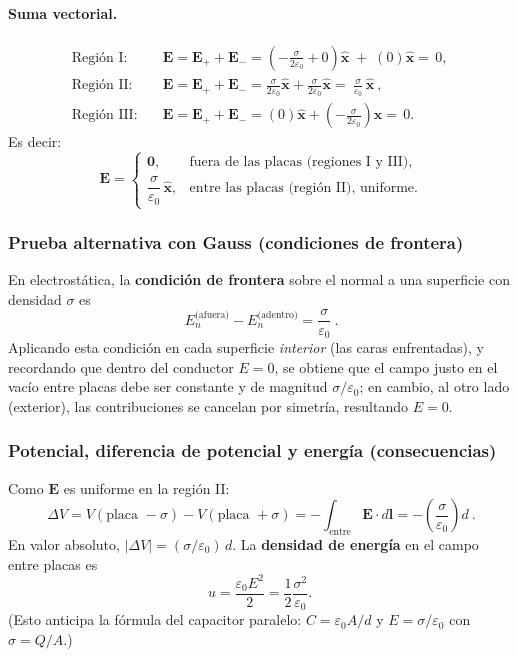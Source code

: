\documentclass{article}
\begin{document}
\paragraph{Suma vectorial.}
\[
\boxed{
\begin{aligned}
\text{Región I:}\quad &\mathbf E=\mathbf E_{+}+\mathbf E_{-}
= \left(-\frac{\sigma}{2\varepsilon_0} + 0\right)\hat{\mathbf x}
\;+\;\left(0\right)\hat{\mathbf x}
= \,0,\\[4pt]
\text{Región II:}\quad &\mathbf E=\mathbf E_{+}+\mathbf E_{-}
= \frac{\sigma}{2\varepsilon_0}\hat{\mathbf x}
+\frac{\sigma}{2\varepsilon_0}\hat{\mathbf x}
= \boxed{\ \frac{\sigma}{\varepsilon_0}\,\hat{\mathbf x}\ },\\[4pt]
\text{Región III:}\quad &\mathbf E=\mathbf E_{+}+\mathbf E_{-}
= \left(0\right)\hat{\mathbf x}
+\left(-\frac{\sigma}{2\varepsilon_0}\right)\hat{\mathbf x}
= \,0.
\end{aligned}}
\]
Es decir:
\[
\boxed{\ \mathbf E=\begin{cases}
\mathbf 0, & \text{fuera de las placas (regiones I y III)},\\[4pt]
\dfrac{\sigma}{\varepsilon_0}\,\hat{\mathbf x}, & \text{entre las placas (región II), uniforme.}
\end{cases}}
\]

\subsubsection*{Prueba alternativa con Gauss (condiciones de frontera)}
En electrostática, la \textbf{condición de frontera} sobre el normal a una superficie con densidad $\sigma$ es
\[
\boxed{\ E_{n}^{\text{(afuera)}}-E_{n}^{\text{(adentro)}}=\frac{\sigma}{\varepsilon_0}\ }.
\]
Aplicando esta condición en cada superficie \emph{interior} (las caras enfrentadas), y recordando que dentro del conductor $E=0$, se obtiene que el campo justo en el vacío entre placas debe ser constante y de magnitud $\sigma/\varepsilon_0$; en cambio, al otro lado (exterior), las contribuciones se cancelan por simetría, resultando $E=0$.

\subsubsection*{Potencial, diferencia de potencial y energía (consecuencias)}
Como $\mathbf E$ es uniforme en la región II:
\[
\boxed{\ \Delta V = V(\text{placa }-\sigma)-V(\text{placa }+\sigma)= -\int_{\text{entre}} \mathbf E\cdot d\mathbf l
= -\left(\frac{\sigma}{\varepsilon_0}\right)d\ }.
\]
En valor absoluto, $|\Delta V|=(\sigma/\varepsilon_0)\,d$.  
La \textbf{densidad de energía} en el campo entre placas es
\[
u=\frac{\varepsilon_0 E^2}{2}=\frac{1}{2}\frac{\sigma^2}{\varepsilon_0}.
\]
(Esto anticipa la fórmula del capacitor paralelo: $C=\varepsilon_0 A/d$ y $E=\sigma/\varepsilon_0$ con $\sigma=Q/A$.)
\end{document}
